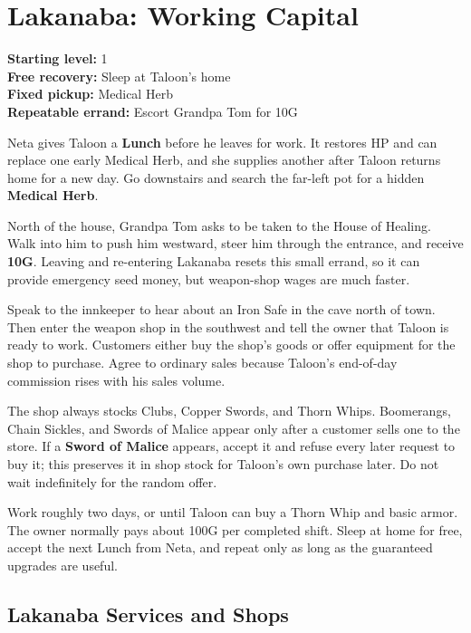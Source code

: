 \documentclass[
  american,
  10pt,
  letterpaper,
  oneside,
  open=any]{scrreprt}
\begin{document}
\section{Lakanaba: Working Capital}\label{lakanaba-working-capital}

\textbf{Starting level:} 1\\
\textbf{Free recovery:} Sleep at Taloon's home\\
\textbf{Fixed pickup:} Medical Herb\\
\textbf{Repeatable errand:} Escort Grandpa Tom for 10G

Neta gives Taloon a \textbf{Lunch} before he leaves for work. It
restores HP and can replace one early Medical Herb, and she supplies
another after Taloon returns home for a new day. Go downstairs and
search the far-left pot for a hidden \textbf{Medical Herb}.

North of the house, Grandpa Tom asks to be taken to the House of
Healing. Walk into him to push him westward, steer him through the
entrance, and receive \textbf{10G}. Leaving and re-entering Lakanaba
resets this small errand, so it can provide emergency seed money, but
weapon-shop wages are much faster.

Speak to the innkeeper to hear about an Iron Safe in the cave north of
town. Then enter the weapon shop in the southwest and tell the owner
that Taloon is ready to work. Customers either buy the shop's goods or
offer equipment for the shop to purchase. Agree to ordinary sales
because Taloon's end-of-day commission rises with his sales volume.

The shop always stocks Clubs, Copper Swords, and Thorn Whips.
Boomerangs, Chain Sickles, and Swords of Malice appear only after a
customer sells one to the store. If a \textbf{Sword of Malice} appears,
accept it and refuse every later request to buy it; this preserves it in
shop stock for Taloon's own purchase later. Do not wait indefinitely for
the random offer.

Work roughly two days, or until Taloon can buy a Thorn Whip and basic
armor. The owner normally pays about 100G per completed shift. Sleep at
home for free, accept the next Lunch from Neta, and repeat only as long
as the guaranteed upgrades are useful.

\subsection{Lakanaba Services and
Shops}\label{lakanaba-services-and-shops}
\end{document}
